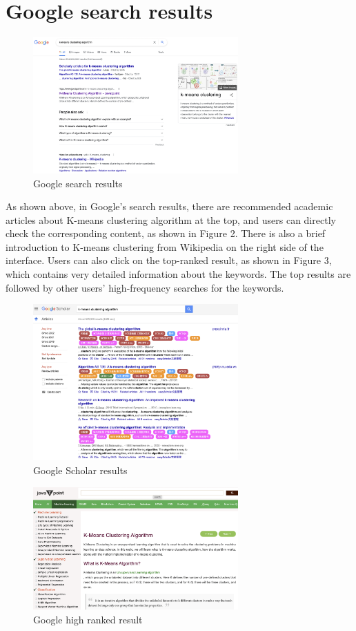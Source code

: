 \documentclass{article}
\begin{document}
    \section{Google search results}
    \begin{figure}[ht]
        \centering
        \includegraphics[width=0.7\textwidth]{Google_home.png}
        \caption{Google search results}
    \end{figure}
    \noindent As shown above, in Google's search results, there are recommended academic articles about K-means clustering algorithm at the top, and users can directly check the corresponding content, as shown in Figure 2. There is also a brief introduction to K-means clustering from Wikipedia on the right side of the interface. Users can also click on the top-ranked result, as shown in Figure 3, which contains very detailed information about the keywords. The top results are followed by other users' high-frequency searches for the keywords.
    \begin{figure}[ht]
        \centering
        \includegraphics[width=0.7\textwidth]{googleScholar.png}
        \caption{Google Scholar results}
    \end{figure}
    \begin{figure}[ht]
        \centering
        \includegraphics[width=0.7\textwidth]{google1.png}
        \caption{Google high ranked result}
    \end{figure}
\end{document}
